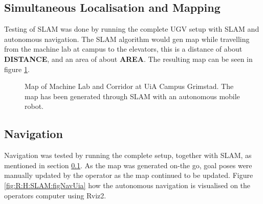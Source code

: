 \subsection{Simultaneous Localisation and Mapping}\label{sec:R:AN:SLAM}
Testing of SLAM was done by running the complete UGV setup with SLAM and autonomous navigation. The SLAM algorithm would gen  map while travelling from the machine lab at campus to the elevators, this is a distance of about \textbf{DISTANCE}, and an area of about \textbf{AREA}. The resulting map can be seen in figure \ref{fig:R:AN:SLAM:figUiaMap}.

\begin{figure}[H]
  \centering
  
  \caption{Map of Machine Lab and Corridor at UiA Campus Grimstad. The map has been generated through SLAM with an autonomous mobile robot.}
  \label{fig:R:AN:SLAM:figUiaMap}
\end{figure}

\subsection{Navigation}\label{sec:R:AN:Navigation}
Navigation was tested by running the complete setup, together with SLAM, as mentioned in section \ref{sec:R:AN:SLAM}. As the map was generated on-the go, goal poses were manually updated by the operator as the map continued to be updated. Figure \ref{fig:R:H:SLAM:figNavUia} how the autonomous navigation is visualised on the operators computer using Rviz2.

